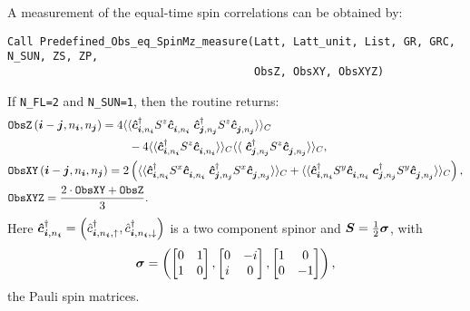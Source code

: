 A measurement of the equal-time spin correlations can be obtained by:
\begin{lstlisting}[style=fortran]
Call Predefined_Obs_eq_SpinMz_measure(Latt, Latt_unit, List, GR, GRC, N_SUN, ZS, ZP,
                                      ObsZ, ObsXY, ObsXYZ)
\end{lstlisting}
If \texttt{N\_FL=2} and \texttt{N\_SUN=1}, then the routine returns:
\begin{align}
&\texttt{ObsZ}\left(\ve{i}-\ve{j}, n_{\ve{i}},  n_{\ve{j}} \right)  =  \begin{multlined}[t]  4 \langle \langle \ve{\hat{c}}^{\dagger}_{\ve{i}, n_{\ve{i}}} S^z \ve{\hat{c}}^{\phantom\dagger}_{\ve{i}, n_{\ve{i}} }   \;  \ve{\hat{c}}^{\dagger}_{\ve{j}, n_{\ve{j}}} S^z  \ve{\hat{c}}^{\phantom\dagger}_{\ve{j}, n_{\ve{j}}}\rangle \rangle_{C} \\
-    4 \langle \langle \ve{\hat{c}}^{\dagger}_{\ve{i}, n_{\ve{i}}} S^z \ve{\hat{c}}^{\phantom\dagger}_{\ve{i}, n_{\ve{i}} } \rangle \rangle_{C}  \langle \langle \  \ve{\hat{c}}^{\dagger}_{\ve{j}, n_{\ve{j}}} S^z  \ve{\hat{c}}^{\phantom\dagger}_{\ve{j}, n_{\ve{j}}}\rangle \rangle_{C} ,  \end{multlined} \nonumber \\  
&\texttt{ObsXY}\left(\ve{i}-\ve{j}, n_{\ve{i}},  n_{\ve{j}} \right)  =  2 \left( \langle \langle \ve{\hat{c}}^{\dagger}_{\ve{i}, n_{\ve{i}}} S^x \ve{\hat{c}}^{\phantom\dagger}_{\ve{i}, n_{\ve{i}} }   \;  \ve{\hat{c}}^{\dagger}_{\ve{j}, n_{\ve{j}}} S^x  
\ve{\hat{c}}^{\phantom\dagger}_{\ve{j}, n_{\ve{j}}}\rangle \rangle_{C}  +
\langle \langle \ve{\hat{c}}^{\dagger}_{\ve{i}, n_{\ve{i}}} S^y \ve{\hat{c}}^{\phantom\dagger}_{\ve{i}, n_{\ve{i}} }   \;  \ve{c}^{\dagger}_{\ve{j}, n_{\ve{j}}} S^y  \ve{\hat{c}}^{\phantom\dagger}_{\ve{j}, n_{\ve{j}}}\rangle \rangle_{C}  \right), \nonumber \\
&\texttt{ObsXYZ} =  \frac{2\cdot\texttt{ObsXY} + \texttt{ObsZ}}{3}.
\end{align}
Here  $\boldsymbol{\hat{c}}^{\dagger}_{\boldsymbol{i}, n_{\boldsymbol{i}}} =  \left( \hat{c}^{\dagger}_{\boldsymbol{i}, n_{\boldsymbol{i}},\uparrow},  \hat{c}^{\dagger}_{\boldsymbol{i}, n_{\boldsymbol{i}},\downarrow} \right) $ is a two component spinor and   $ \boldsymbol{S} = \frac{1}{2} \boldsymbol{\sigma}$, with
\begin{equation}
\boldsymbol{\sigma}   = \left(
\begin{bmatrix} 
0 & 1 \\
1 & 0 
\end{bmatrix},
\begin{bmatrix} 
0 & -i \\
i & 0 
\end{bmatrix},
\begin{bmatrix} 
1 & 0 \\
0 & -1 
\end{bmatrix}
\right), \label{eq:vecPaulimat}
\end{equation}
the Pauli spin  matrices. 

